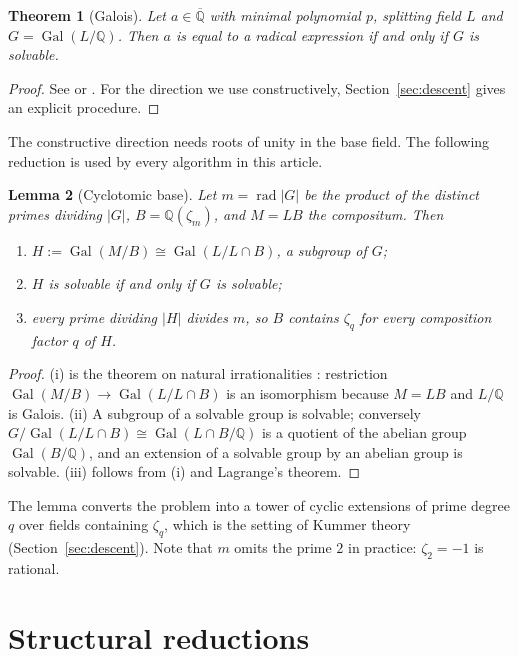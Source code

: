 \documentclass[11pt,a4paper]{article}
\newtheorem{theorem}{Theorem}[section]
\newtheorem{lemma}[theorem]{Lemma}
\theoremstyle{definition}
\theoremstyle{remark}
\newcommand{\Q}{\mathbb{Q}}
\newcommand{\Qbar}{\overline{\Q}}
\newcommand{\Gal}{\operatorname{Gal}}
\newcommand{\rad}{\operatorname{rad}}
\begin{document}
\begin{theorem}[Galois]\label{thm:galois}
Let $a\in\Qbar$ with minimal polynomial $p$, splitting field $L$ and $G=\Gal(L/\Q)$.
Then $a$ is equal to a radical expression if and only if $G$ is solvable.
\end{theorem}

\begin{proof}
See \cite[Chapter 5]{Milne} or \cite[\S 14.7]{DummitFoote}.  For the direction we use
constructively, Section~\ref{sec:descent} gives an explicit procedure.
\end{proof}

The constructive direction needs roots of unity in the base field.  The following
reduction is used by every algorithm in this article.

\begin{lemma}[Cyclotomic base]\label{lem:base}
Let $m=\rad|G|$ be the product of the distinct primes dividing $|G|$, $B=\Q(\zeta_m)$,
and $M=LB$ the compositum.  Then
\begin{enumerate}[nosep]
\item[(i)] $H:=\Gal(M/B)\cong\Gal(L/L\cap B)$, a subgroup of $G$;
\item[(ii)] $H$ is solvable if and only if $G$ is solvable;
\item[(iii)] every prime dividing $|H|$ divides $m$, so $B$ contains $\zeta_q$ for every
composition factor $q$ of $H$.
\end{enumerate}
\end{lemma}

\begin{proof}
(i) is the theorem on natural irrationalities \cite[Chapter 3]{Milne}: restriction
$\Gal(M/B)\to\Gal(L/L\cap B)$ is an isomorphism because $M=LB$ and $L/\Q$ is Galois.
(ii) A subgroup of a solvable group is solvable; conversely $G/\Gal(L/L\cap B)\cong\Gal(L\cap B/\Q)$
is a quotient of the abelian group $\Gal(B/\Q)$, and an extension of a solvable group by
an abelian group is solvable.  (iii) follows from (i) and Lagrange's theorem.
\end{proof}

The lemma converts the problem into a tower of cyclic extensions of prime degree $q$ over
fields containing $\zeta_q$, which is the setting of Kummer theory
(Section~\ref{sec:descent}).  Note that $m$ omits the prime $2$ in practice: $\zeta_2=-1$
is rational.

\section{Structural reductions}\label{sec:structural}
\end{document}
